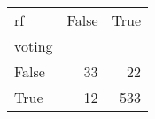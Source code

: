 \begin{tabular}{lrr}
\toprule
rf &  False &  True  \\
voting &        &        \\
\midrule
False  &     33 &     22 \\
True   &     12 &    533 \\
\bottomrule
\end{tabular}
